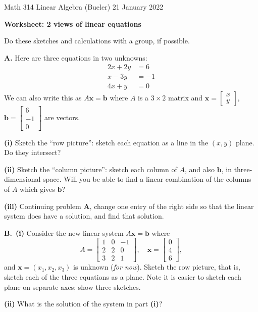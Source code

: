 \documentclass[11pt]{amsart}
\newcommand{\bb}{\mathbf{b}}
\newcommand{\bx}{\mathbf{x}}
\newcommand{\prob}[1]{\bigskip\noindent\textbf{#1.}\quad }
\newcommand{\epart}[1]{\bigskip\noindent\textbf{(#1)}\quad }
\newcommand{\ppart}[1]{\,\textbf{(#1)}\quad }
\begin{document}
\scriptsize \noindent Math 314 Linear Algebra (Bueler) \hfill 21 January 2022 
\normalsize\medskip

\Large\centerline{\textbf{Worksheet: 2 views of linear equations}}
\medskip
\normalsize

\thispagestyle{empty}
\begin{center}
Do these sketches and calculations with a group, if possible.
\end{center}

\prob{A}  Here are three equations in two unknowns:
\begin{align*}
2 x + 2 y &= 6 \\
x - 3 y &= -1 \\
4 x + y &= 0
\end{align*}
We can also write this as $A \bx = \bb$ where $A$ is a $3\times 2$ matrix and $\bx = \begin{bmatrix} x \\ y \end{bmatrix}$, $\bb = \begin{bmatrix} 6 \\ -1 \\ 0 \end{bmatrix}$ are vectors.

\epart{i} Sketch the ``row picture'': sketch each equation as a line in the $(x,y)$ plane.  Do they intersect?

\vfill
\epart{ii} Sketch the ``column picture'': sketch each column of $A$, and also $\bb$, in three-dimensional space.  Will you be able to find a linear combination of the columns of $A$ which gives $\bb$?

\vfill

\clearpage\newpage
\epart{iii}  Continuing problem \textbf{A}, change one entry of the right side so that the linear system does have a solution, and find that solution.

\vspace{2.5in}
\prob{B}  \ppart{i}  Consider the new linear system $A\bx=\bb$ where
    $$A = \begin{bmatrix} 1 & 0 & -1 \\ 2 & 2 & 0 \\ 3 & 2 & 1 \end{bmatrix}, \quad \bx = \begin{bmatrix} 0 \\ 4 \\ 6 \end{bmatrix},$$
and $\bx = (x_1,x_2,x_3)$ is unknown (\emph{for now}).  Sketch the row picture, that is, sketch each of the three equations as a plane.  Note it is easier to sketch each plane on separate axes; show three sketches.
\vfill

\epart{ii}  What is the solution of the system in part \textbf{(i)}?
\vspace{1.0in}
\end{document}
